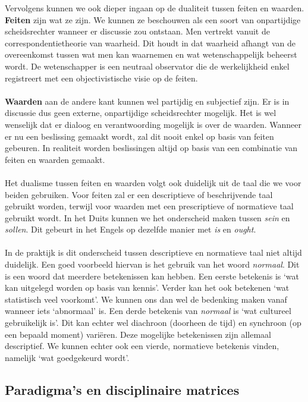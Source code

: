 \documentclass[../summary.tex]{subfiles}
\begin{document}
	Vervolgens kunnen we ook dieper ingaan op de dualiteit tussen feiten en waarden. \textbf{Feiten} zijn wat ze zijn. We kunnen ze beschouwen als een soort van onpartijdige scheidsrechter wanneer er discussie zou ontstaan. Men vertrekt vanuit de correspondentietheorie van waarheid. Dit houdt in dat waarheid afhangt van de overeenkomst tussen wat men kan waarnemen en wat wetenschappelijk beheerst wordt. De wetenschapper is een neutraal observator die de werkelijkheid enkel registreert met een objectivistische visie op de feiten.
	\\\\
	\textbf{Waarden} aan de andere kant kunnen wel partijdig en subjectief zijn. Er is in discussie dus geen externe, onpartijdige scheidsrechter mogelijk. Het is wel wenselijk dat er dialoog en verantwoording mogelijk is over de waarden. Wanneer er nu een beslissing gemaakt wordt, zal dit nooit enkel op basis van feiten gebeuren. In realiteit worden beslissingen altijd op basis van een combinatie van feiten en waarden gemaakt. 
	\\\\
	Het dualisme tussen feiten en waarden volgt ook duidelijk uit de taal die we voor beiden gebruiken. Voor feiten zal er een descriptieve of beschrijvende taal gebruikt worden, terwijl voor waarden met een prescriptieve of normatieve taal gebruikt wordt. In het Duits kunnen we het onderscheid maken tussen \textit{sein} en \textit{sollen}. Dit gebeurt in het Engels op dezelfde manier met \textit{is} en \textit{ought}. 
	\\\\
	In de praktijk is dit onderscheid tussen descriptieve en normatieve taal niet altijd duidelijk. Een goed voorbeeld hiervan is het gebruik van het woord \textit{normaal}. Dit is een woord dat meerdere betekenissen kan hebben. Een eerste betekenis is `wat kan uitgelegd worden op basis van kennis'. Verder kan het ook betekenen `wat statistisch veel voorkomt'. We kunnen ons dan wel de bedenking maken vanaf wanneer iets `abnormaal' is. Een derde betekenis van \textit{normaal} is `wat cultureel gebruikelijk is'. Dit kan echter wel diachroon (doorheen de tijd) en synchroon (op een bepaald moment) variëren. Deze mogelijke betekenissen zijn allemaal descriptief. We kunnen echter ook een vierde, normatieve betekenis vinden, namelijk `wat goedgekeurd wordt'.
	
	\subsection{Paradigma's en disciplinaire matrices}
	
\end{document}
